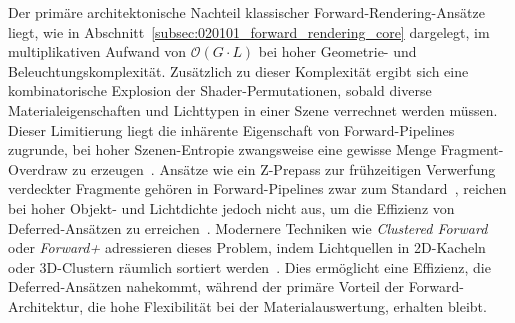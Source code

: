 Der primäre architektonische Nachteil klassischer Forward-Rendering-Ansätze liegt, wie in
Abschnitt~\ref{subsec:020101_forward_rendering_core} dargelegt, im multiplikativen Aufwand von $\mathcal{O}(G \cdot L)$ bei hoher
Geometrie- und Beleuchtungskomplexität.
Zusätzlich zu dieser Komplexität ergibt sich eine kombinatorische Explosion der Shader-Permutationen, sobald diverse
Materialeigenschaften und Lichttypen in einer Szene verrechnet werden müssen.
Dieser Limitierung liegt die inhärente Eigenschaft von Forward-Pipelines zugrunde, bei hoher Szenen-Entropie
zwangsweise eine gewisse Menge Fragment-Overdraw zu erzeugen~\cite[S.~1]{fatahalianReducingShadingGPUs2010}.
Ansätze wie ein Z-Prepass zur frühzeitigen Verwerfung verdeckter Fragmente gehören in Forward-Pipelines zwar zum
Standard~\cite[S.~57]{burnsVisibilityBufferCacheFriendly2013}, reichen bei hoher Objekt- und Lichtdichte
jedoch nicht aus, um die Effizienz von Deferred-Ansätzen zu
erreichen~\cite[S.~4]{Thaler2011DeferredRendering}.
Modernere Techniken wie \textit{Clustered Forward} oder \textit{Forward+} adressieren dieses Problem, indem
Lichtquellen in 2D-Kacheln oder 3D-Clustern räumlich sortiert
werden~\cite{olssonClusteredDeferredForward2012, haradaForwardBringingDeferred2012}.
Dies ermöglicht eine Effizienz, die Deferred-Ansätzen nahekommt, während der primäre Vorteil der Forward-Architektur,
die hohe Flexibilität bei der Materialauswertung, erhalten bleibt.

